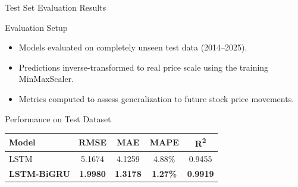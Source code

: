 \begin{frame}[shrink]{Test Set Evaluation Results}

\begin{block}{Evaluation Setup}
    \begin{itemize}
        \item Models evaluated on completely unseen test data (2014–2025).
        \item Predictions inverse-transformed to real price scale using the training MinMaxScaler.
        \item Metrics computed to assess generalization to future stock price movements.
    \end{itemize}
\end{block}

\vspace{0.8em}

\begin{block}{Performance on Test Dataset}
\centering
\begin{tabular}{lcccc}
\hline
\textbf{Model} & \textbf{RMSE} & \textbf{MAE} & \textbf{MAPE} & \textbf{R\textsuperscript{2}} \\
\hline\hline
LSTM & 5.1674 & 4.1259 & 4.88\% & 0.9455 \\
\textbf{LSTM-BiGRU} & \textbf{1.9980} & \textbf{1.3178} & \textbf{1.27\%} & \textbf{0.9919} \\
\hline
\end{tabular}
\end{block}

\end{frame}

